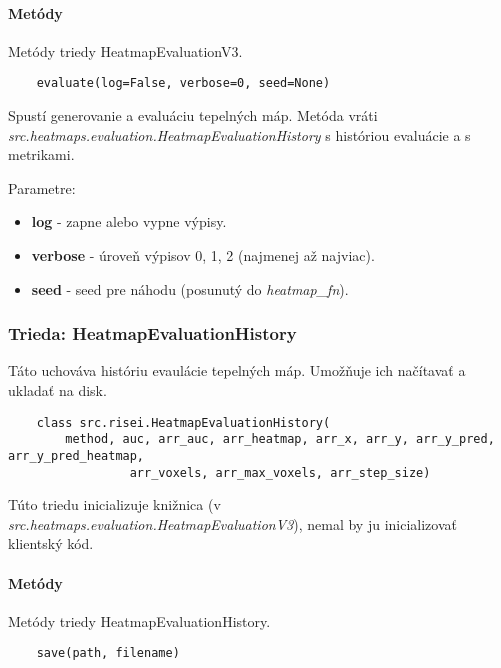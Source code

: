 \paragraph{Metódy}

Metódy triedy HeatmapEvaluationV3.

\vspace{8pt}
\begin{lstlisting}
    evaluate(log=False, verbose=0, seed=None)
\end{lstlisting}

Spustí generovanie a evaluáciu tepelných máp. Metóda vráti \textit{src.heatmaps.\-evaluation.\-Heatmap\-EvaluationHistory} s históriou evaluácie a s metrikami.

Parametre:
\begin{itemize}
    \item \textbf{log} - zapne alebo vypne výpisy.
    \item \textbf{verbose} - úroveň výpisov 0, 1, 2 (najmenej až najviac).
    \item \textbf{seed} - seed pre náhodu (posunutý do \textit{heatmap\_fn}).
\end{itemize}

\subsubsection{Trieda: HeatmapEvaluationHistory}

Táto uchováva históriu evaulácie tepelných máp. Umožňuje ich načítavať a ukladať na disk.

\begin{lstlisting}
    class src.risei.HeatmapEvaluationHistory(
        method, auc, arr_auc, arr_heatmap, arr_x, arr_y, arr_y_pred, arr_y_pred_heatmap,
                 arr_voxels, arr_max_voxels, arr_step_size)
\end{lstlisting}

Túto triedu inicializuje knižnica (v \textit{src.heatmaps.\-evaluation.\-HeatmapEvaluationV3}), nemal by ju inicializovať klientský kód.

\paragraph{Metódy}

Metódy triedy HeatmapEvaluationHistory.

\vspace{8pt}
\begin{lstlisting}
    save(path, filename)
\end{lstlisting}

